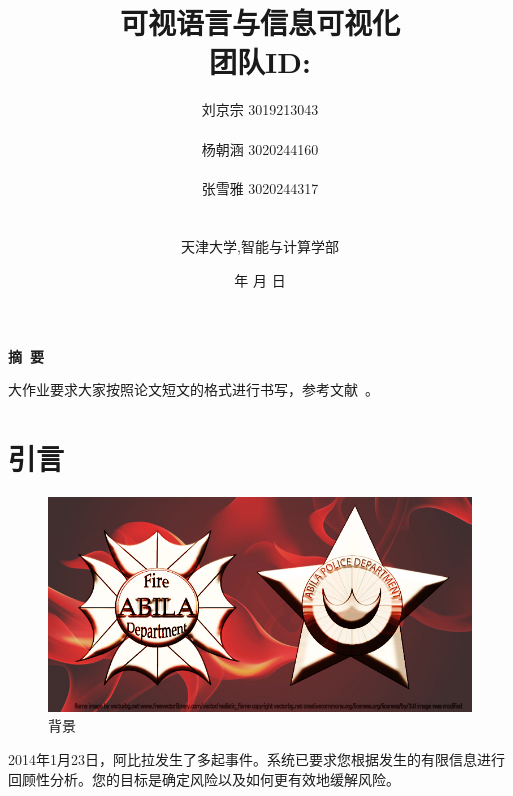 \documentclass[a4paper]{article}
\begin{document}
\renewcommand{\contentsname}{目\ 录}
\renewcommand{\appendixname}{附录}
\renewcommand{\appendixpagename}{附录}
\renewcommand{\refname}{参考文献}

\renewcommand{\tablename}{表}
\renewcommand{\today}{\number\year 年 \number\month 月 \number\day 日}

\title{{\Huge 可视语言与信息可视化{\large\linebreak\\}}{\Large 团队ID: \linebreak}
{\Large  \linebreak\linebreak}}
\author{ \large
  刘京宗 3019213043
  \\\\
  杨朝涵 3020244160
  \\\\
  张雪雅 3020244317
  \\\\\\
  天津大学,智能与计算学部}
\date{\today}
\maketitle
\newpage

\begin{center}
  \tableofcontents\label{c}
\end{center}
\newpage


\begin{center}
  {\Large\bf{摘\ 要\\}}

  大作业要求大家按照论文短文的格式进行书写，参考文献~\cite{bayrak2020pragma, govyadinov2019graph}。



\end{center}

\newpage



\section{引言}
\label{overview}
\begin{figure}[htbp]
  \centering
  \includegraphics[width=1\textwidth]{images/MC3.jpg}
  \caption{背景}\label{fig:MC3}
  \vspace{\baselineskip}
\end{figure}
2014年1月23日，阿比拉发生了多起事件。系统已要求您根据发生的有限信息进行回顾性分析。您的目标是确定风险以及如何更有效地缓解风险。
\end{document}
